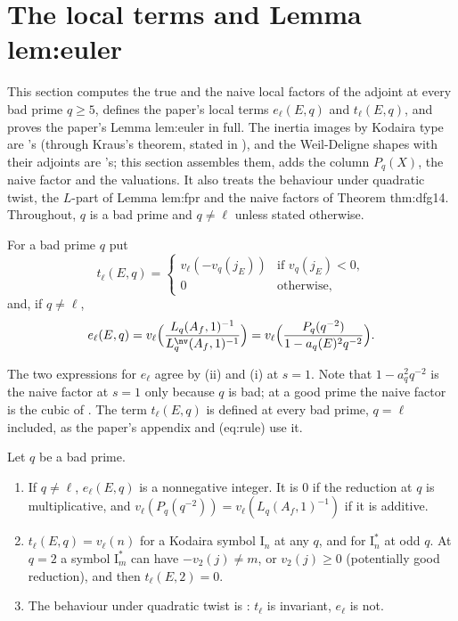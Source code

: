 \section{The local terms and Lemma lem:euler}\label{sec:lfunctions:local-terms}

This section computes the true and the naive local factors of the adjoint at every bad prime $q\ge5$, defines the paper's local terms $e_\ell(E,q)$ and
$t_\ell(E,q)$, and proves the paper's Lemma lem:euler in full. The inertia images by Kodaira type are 's (through Kraus's theorem, stated in
), and the Weil-Deligne shapes with their adjoints are 's; this section assembles them, adds the column $P_q(X)$, the naive factor
and the valuations. It also treats the behaviour under quadratic twist, the $L$-part of Lemma lem:fpr and the naive factors of Theorem thm:dfg14. Throughout,
$q$ is a bad prime and $q\ne\ell$ unless stated otherwise.

\begin{definition}\label{def:lfunctions:terms}
For a bad prime $q$ put
\[
t_\ell(E,q)=\begin{cases}v_\ell(-v_q(j_E))&\text{if }v_q(j_E)<0,\\0&\text{otherwise,}\end{cases}
\]
and, if $q\ne\ell$,
\[
e_\ell(E,q)=v_\ell\Bigl(\frac{L_q(A_f,1)^{-1}}{L_q^{\nv}(A_f,1)^{-1}}\Bigr)=v_\ell\Bigl(\frac{P_q(q^{-2})}{1-a_q(E)^2q^{-2}}\Bigr).
\]
\end{definition}

The two expressions for $e_\ell$ agree by (ii) and (i) at $s=1$. Note that $1-a_q^2q^{-2}$ is the naive factor at $s=1$ only
because $q$ is bad; at a good prime the naive factor is the cubic of . The term $t_\ell(E,q)$ is defined at every bad prime,
$q=\ell$ included, as the paper's appendix and (eq:rule) use it.

\begin{proposition}\label{prop:lfunctions:terms}
Let $q$ be a bad prime.
\begin{enumerate}[label=(\roman*)]
\item If $q\ne\ell$, $e_\ell(E,q)$ is a nonnegative integer. It is $0$ if the reduction at $q$ is multiplicative, and $v_\ell(P_q(q^{-2}))=v_\ell(L_q(A_f,1)^{-1})$ if it is additive.
\item $t_\ell(E,q)=v_\ell(n)$ for a Kodaira symbol $\mathrm I_n$ at any $q$, and for $\mathrm I_n^*$ at odd $q$. At $q=2$ a symbol $\mathrm I_m^*$ can have $-v_2(j)\ne m$, or $v_2(j)\ge0$
(potentially good reduction), and then $t_\ell(E,2)=0$.
\item The behaviour under quadratic twist is : $t_\ell$ is invariant, $e_\ell$ is not.
\end{enumerate}
\end{proposition}

